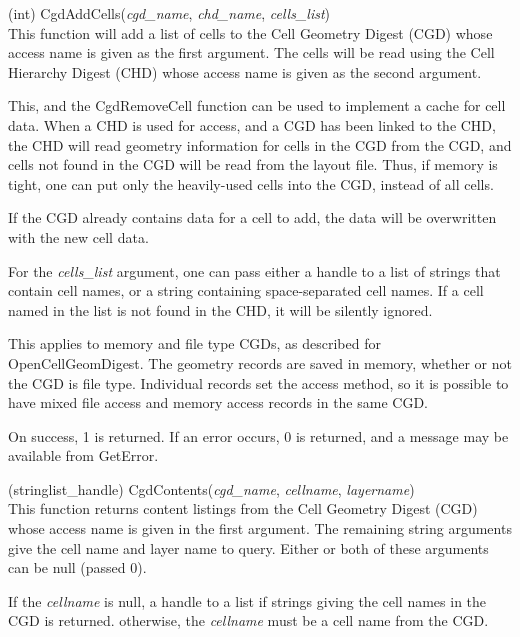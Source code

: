 \begin{description}
\item{(int) \vt CgdAddCells({\it cgd\_name\/}, {\it chd\_name\/},
 {\it cells\_list\/})}\\
This function will add a list of cells to the Cell Geometry Digest
(CGD) whose access name is given as the first argument.  The cells
will be read using the Cell Hierarchy Digest (CHD) whose access name
is given as the second argument.

This, and the {\vt CgdRemoveCell} function can be used to implement a
cache for cell data.  When a CHD is used for access, and a CGD has
been linked to the CHD, the CHD will read geometry information for
cells in the CGD from the CGD, and cells not found in the CGD will be
read from the layout file.  Thus, if memory is tight, one can put only
the heavily-used cells into the CGD, instead of all cells.

If the CGD already contains data for a cell to add, the data will be
overwritten with the new cell data.
    
For the {\it cells\_list} argument, one can pass either a handle to a
list of strings that contain cell names, or a string containing
space-separated cell names.  If a cell named in the list is not found
in the CHD, it will be silently ignored.

This applies to memory and file type CGDs, as described for {\vt
OpenCellGeomDigest}.  The geometry records are saved in memory,
whether or not the CGD is file type.  Individual records set the
access method, so it is possible to have mixed file access and memory
access records in the same CGD.

On success, 1 is returned.  If an error occurs, 0 is returned, and a
message may be available from {\vt GetError}.

\item{(stringlist\_handle) \vt CgdContents({\it cgd\_name\/},
 {\it cellname\/}, {\it layername\/})}\\
This function returns content listings from the Cell Geometry Digest
(CGD) whose access name is given in the first argument.  The remaining
string arguments give the cell name and layer name to query.  Either
or both of these arguments can be null (passed 0).

If the {\it cellname} is null, a handle to a list if strings giving
the cell names in the CGD is returned.  otherwise, the {\it cellname}
must be a cell name from the CGD.


\end{description}
